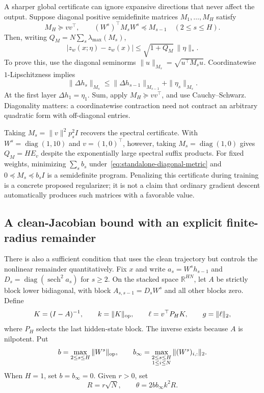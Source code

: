A sharper global certificate can ignore expansive directions that
never affect the output. Suppose diagonal positive semidefinite matrices
$M_1,\ldots,M_H$ satisfy
\begin{equation}\label{eq:standalone-diagonal-metric}
 M_H\succeq vv^\top,\qquad
 (W^s)^\top M_sW^s\preceq M_{s-1}\quad(2\le s\le H).
\end{equation}
Then, writing $Q_M=N\sum_s\lambda_{\max}(M_s)$,
\begin{equation}\label{eq:standalone-diagonal-certificate}
 |z_w(x;\eta)-z_w(x)|\le\sqrt{1+Q_M}\,\|\eta\|_*.
\end{equation}
To prove this, use the diagonal seminorms
$\|u\|_{M_s}=\sqrt{u^\top M_su}$. Coordinatewise $1$-Lipschitzness
implies
\[
 \|\Delta h_s\|_{M_s}
 \le\|\Delta h_{s-1}\|_{M_{s-1}}+\|\eta_s\|_{M_s}.
\]
At the first layer $\Delta h_1=\eta_1$. Sum, apply
$M_H\succeq vv^\top$, and use Cauchy--Schwarz. Diagonality matters:
a coordinatewise contraction need not contract an arbitrary quadratic
form with off-diagonal entries.

Taking $M_s=\|v\|^2p_s^2I$ recovers the spectral certificate. With
$W^s=\operatorname{diag}(1,10)$ and $v=(1,0)^\top$, however, taking
$M_s=\operatorname{diag}(1,0)$ gives $Q_M=H E_v$ despite the
exponentially large spectral suffix products. For fixed weights,
minimizing $\sum_sb_s$ under~\eqref{eq:standalone-diagonal-metric}
and $0\preceq M_s\preceq b_sI$ is a semidefinite program. Penalizing
this certificate during training is a concrete proposed regularizer;
it is not a claim that ordinary gradient descent automatically produces
such matrices with a favorable value.

\subsection{A clean-Jacobian bound with an explicit finite-radius remainder}

There is also a sufficient condition that uses the clean trajectory
but controls the nonlinear remainder quantitatively. Fix $x$ and write
$a_s=W^sh_{s-1}$ and $D_s=\operatorname{diag}(\operatorname{sech}^2 a_s)$
for $s\ge2$. On the stacked space $\mathbb R^{HN}$, let $A$ be strictly
block lower bidiagonal, with block $A_{s,s-1}=D_sW^s$ and all other
blocks zero. Define
\[
 K=(I-A)^{-1},\qquad
 k=\|K\|_{\rm op},\qquad
 \ell=v^\top P_HK,\qquad g=\|\ell\|_2,
\]
where $P_H$ selects the last hidden-state block. The inverse exists
because $A$ is nilpotent. Put
\[
 b=\max_{2\le s\le H}\|W^s\|_{\rm op},\qquad
 b_\infty=\max_{\substack{2\le s\le H\\1\le i\le N}}\|(W^s)_{i,:}\|_2.
\]
When $H=1$, set $b=b_\infty=0$. Given $r>0$, set
\[
 R=r\sqrt N,\qquad \theta=2bb_\infty k^2R.
\]

